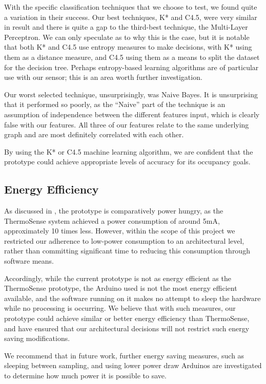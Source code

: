 \documentclass[../thesis/thesis.tex]{subfiles}
\begin{document}
With the specific classification techniques that we choose to test, we found quite a variation in their success. Our best techniques, K* and C4.5, were very similar in result and there is quite a gap to the third-best technique, the Multi-Layer Perceptron. We can only speculate as to why this is the case, but it is notable that both K* and C4.5 use entropy measures to make decisions, with K* using them as a distance measure, and C4.5 using them as a means to split the dataset for the decision tree. Perhaps entropy-based learning algorithms are of particular use with our sensor; this is an area worth further investigation.

Our worst selected technique, unsurprisingly, was Naive Bayes. It is unsurprising that it performed so poorly, as the ``Naive'' part of the technique is an assumption of independence between the different features input, which is clearly false with our features. All three of our features relate to the same underlying graph and are most definitely correlated with each other.

By using the K* or C4.5 machine learning algorithm, we are confident that the prototype could achieve appropriate levels of accuracy for its occupancy goals.

\subsection{Energy Efficiency}

As discussed in , the prototype is comparatively power hungry, as the ThermoSense system achieved a power consumption of around 5mA, approximately 10 times less. However, within the scope of this project we restricted our adherence to low-power consumption to an architectural level, rather than committing significant time to reducing this consumption through software means.

Accordingly, while the current prototype is not as energy efficient as the ThermoSense prototype, the Arduino used is not the most energy efficient available, and the software running on it makes no attempt to sleep the hardware while no processing is occurring. We believe that with such measures, our prototype could achieve similar or better energy efficiency than ThermoSense, and have ensured that our architectural decisions will not restrict such energy saving modifications.

We recommend that in future work, further energy saving measures, such as sleeping between sampling, and using lower power draw Arduinos are investigated to determine how much power it is possible to save.

\end{document}
